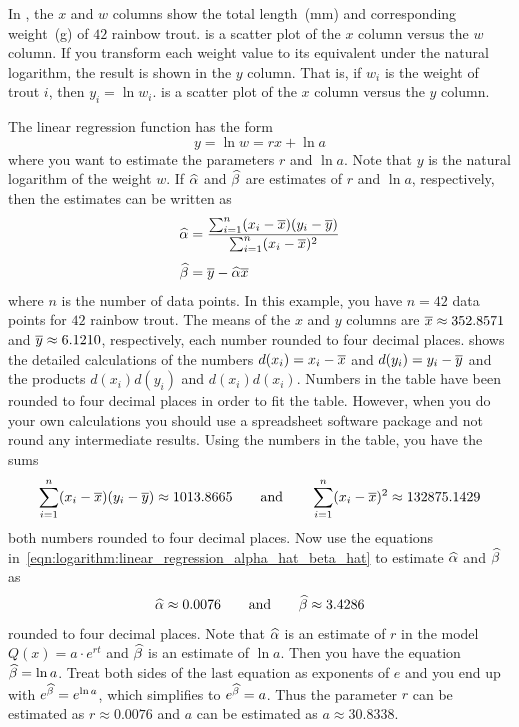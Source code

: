 \documentclass[a4paper,oneside,12pt]{article}
\begin{document}
\begin{solution}
In , the $x$ and $w$ columns show
the total length~(mm) and corresponding weight~(g) of $42$ rainbow
trout.   is a scatter plot
of the $x$ column versus the $w$ column.  If you transform each weight
value to its equivalent under the natural logarithm, the result is
shown in the $y$ column.  That is, if $w_i$ is the weight of trout
$i$, then $y_i = \ln w_i$.  
is a scatter plot of the $x$ column versus the $y$ column.

The linear regression function has the form
\[
y
=
\ln w
=
rx + \ln a
\]
where you want to estimate the parameters $r$ and $\ln a$.  Note that
$y$ is the natural logarithm of the weight $w$.  If $\widehat{\alpha}$ and
$\widehat{\beta}$ are estimates of $r$ and $\ln a$, respectively, then the
estimates can be written as
\begin{equation}
\label{eqn:logarithm:linear_regression_alpha_hat_beta_hat}
\begin{aligned}
\widehat{\alpha}
&=
\frac{
  \sum_{i=1}^n (x_i - \overline{x}) (y_i - \overline{y})
}{
  \sum_{i=1}^n (x_i - \overline{x})^2
} \\[4pt]
\widehat{\beta}
&=
\overline{y} - \widehat{\alpha} \overline{x}
\end{aligned}
\end{equation}
where $n$ is the number of data points.  In this example, you have
$n = 42$ data points for $42$ rainbow trout.  The means of the $x$ and
$y$ columns are $\overline{x} \approx 352.8571$ and
$\overline{y} \approx 6.1210$, respectively, each number rounded to four
decimal places.   shows the
detailed calculations of the numbers $d(x_i) = x_i - \overline{x}$ and
$d(y_i) = y_i - \overline{y}$ and the products $d(x_i) d(y_i)$ and
$d(x_i) d(x_i)$.  Numbers in the table have been rounded to four
decimal places in order to fit the table.  However, when you do your
own calculations you should use a spreadsheet software package and not
round any intermediate results.  Using the numbers in the table, you
have the sums
\[
\sum_{i=1}^n (x_i - \overline{x}) (y_i - \overline{y})
\approx
1013.8665
\qquad
\text{and}
\qquad
\sum_{i=1}^n (x_i - \overline{x})^2
\approx
132875.1429
\]
both numbers rounded to four decimal places.  Now use the equations
in~\eqref{eqn:logarithm:linear_regression_alpha_hat_beta_hat} to
estimate $\widehat{\alpha}$ and $\widehat{\beta}$ as
\[
\widehat{\alpha}
\approx
0.0076
\qquad
\text{and}
\qquad
\widehat{\beta}
\approx
3.4286
\]
rounded to four decimal places.  Note that $\widehat{\alpha}$ is an estimate
of $r$ in the model $Q(x) = a \cdot e^{rt}$ and $\widehat{\beta}$ is an
estimate of $\ln a$.  Then you have the equation $\widehat{\beta} = \ln a$.
Treat both sides of the last equation as exponents of $e$ and you end
up with $e^{\widehat{\beta}} = e^{\ln a}$, which simplifies to
$e^{\widehat{\beta}} = a$.  Thus the parameter $r$ can be estimated as
$r \approx 0.0076$ and $a$ can be estimated as $a \approx 30.8338$.


\end{solution}
\end{document}
